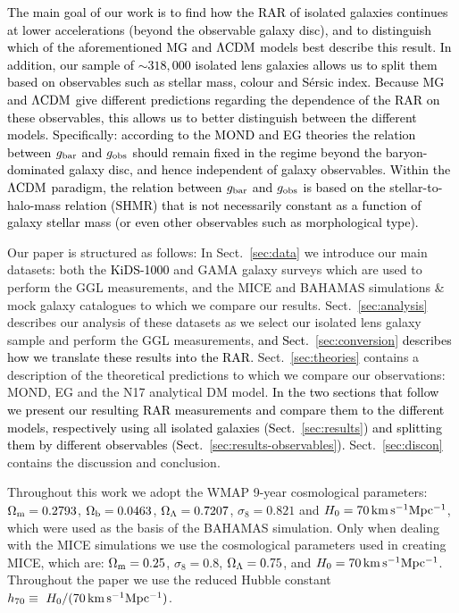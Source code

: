 \documentclass[usenatbib]{mnras}
\newcommand{\lcdm}{{\rm \Lambda CDM}}
\newcommand{\un}[1]{_{\rm #1}}
\begin{document}
\textcolor{black}{The main goal of our work is to find how the RAR of isolated galaxies continues at lower accelerations (beyond the observable galaxy disc), and to distinguish which of the aforementioned MG and $\lcdm$ models best describe this result. In addition, our sample of $\sim318,000$ isolated lens galaxies allows us to split them based on observables such as stellar mass, colour and S\'ersic index. Because MG and $\lcdm$ give different predictions regarding the dependence of the RAR on these observables, this allows us to better distinguish between the different models. Specifically: according to the MOND and EG theories the relation between $g\un{bar}$ and $g\un{obs}$ should remain fixed in the regime beyond the baryon-dominated galaxy disc, and hence independent of galaxy observables. Within the $\lcdm$ paradigm, the relation between $g\un{bar}$ and $g\un{obs}$ is based on the stellar-to-halo-mass relation (SHMR) that is not necessarily constant as a function of galaxy stellar mass (or even other observables such as morphological type).}

Our paper is structured as follows: In Sect.~\ref{sec:data} we introduce our main datasets: both the \textcolor{black}{KiDS-1000} and GAMA galaxy surveys which are used to perform the GGL measurements, and the MICE and BAHAMAS simulations \& mock galaxy catalogues to which we compare our results. Sect.~\ref{sec:analysis} describes our analysis of these datasets as we select our isolated lens galaxy sample and perform the GGL measurements, \textcolor{black}{and Sect.~\ref{sec:conversion} describes how we translate these results into the RAR.} Sect.~\ref{sec:theories} contains a description of the theoretical predictions to which we compare our observations: MOND, EG and the N17 analytical DM model. \textcolor{black}{In the two sections that follow we present our resulting RAR measurements and compare them to the different models, respectively using all isolated galaxies (Sect.~\ref{sec:results}) and splitting them by different observables (Sect.~\ref{sec:results-observables}).} Sect.~\ref{sec:discon} contains the discussion and conclusion.

Throughout this work we adopt the WMAP 9-year \cite[]{hinshaw2013} cosmological parameters: $\Omega\un{m}=0.2793$, $\Omega\un{b}=0.0463$, $\Omega\un{\Lambda}=0.7207$, $\sigma_8=0.821$ and $H_0 = 70 \, {\rm km \, s^{-1} Mpc^{-1}}$, which were used as the basis of the BAHAMAS simulation. Only when dealing with the MICE simulations we use the cosmological parameters used in creating MICE, which are: $\Omega\un{m}=0.25$, $\sigma_8=0.8$, $\Omega\un{\Lambda}=0.75$, and $H_0 = 70 \, {\rm km \, s^{-1} Mpc^{-1}}$. Throughout the paper we use the reduced Hubble constant $h_{70} \equiv \ H_0 / (70 \, {\rm km \, s^{-1} Mpc^{-1}})$.
\end{document}
